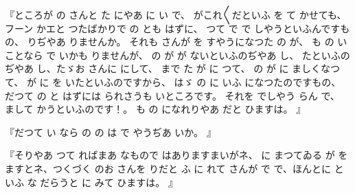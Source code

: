 
『ところが
の
さんと
た
にやあ
に
い
で、
がこれ〳〵だといふ
を
て
かせても、フーン
かエと
つたばかりで
の
とも
はずに、
つて
で
で
しやうといふんですもの、
りぢやあ
りませんか。
それも
さんが
を
すやうになつた
の
が、
も
の
いことなら
で
いかも
りませんが、
の
が
が
ないといふのぢやあ
し、
たといふのぢやあ
し、たゞお
さんに
にして、
まで
た
が
に
つて、
の
が
に
ましくなつて、
が
に
を
いたといふのですから、
はゞ
の
に
いふ
になつたのですもの、
だつて
の
と
はずには
られさうも
いところです。
それを
でしやう
らん
で、
まして
かうといふのです！。
も
の
になれりやあ
だと
ひますは。
』

『だつて
い
なら
の
の
は
で
やうぢあ
いか。
』

『そりやあ
つて
ればまあ
なもので
はありますまいがネ、
に
まつてゐる
が
を
ますとネ、つくづく
のお
さんを
りだと
ふ
に
れて
さんが
で
で、ほんとに
といふ
な
だらうと
に
みて
ひますは。
』

